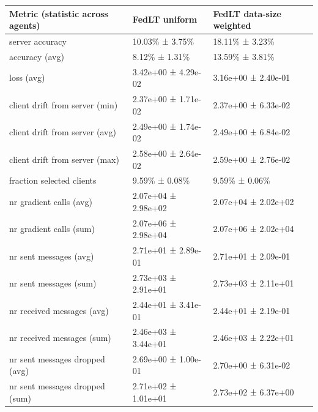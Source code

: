 \begin{tabular}{lll}
\hline
 Metric (statistic across agents)   & FedLT uniform       & FedLT data-size weighted   \\
\hline
 server accuracy                    & 10.03\% ± 3.75\%      & 18.11\% ± 3.23\%             \\
 accuracy (avg)                     & 8.12\% ± 1.31\%       & 13.59\% ± 3.81\%             \\
 loss (avg)                         & 3.42e+00 ± 4.29e-02 & 3.16e+00 ± 2.40e-01        \\
 client drift from server (min)     & 2.37e+00 ± 1.71e-02 & 2.37e+00 ± 6.33e-02        \\
 client drift from server (avg)     & 2.49e+00 ± 1.74e-02 & 2.49e+00 ± 6.84e-02        \\
 client drift from server (max)     & 2.58e+00 ± 2.64e-02 & 2.59e+00 ± 2.76e-02        \\
 fraction selected clients          & 9.59\% ± 0.08\%       & 9.59\% ± 0.06\%              \\
 nr gradient calls (avg)            & 2.07e+04 ± 2.98e+02 & 2.07e+04 ± 2.02e+02        \\
 nr gradient calls (sum)            & 2.07e+06 ± 2.98e+04 & 2.07e+06 ± 2.02e+04        \\
 nr sent messages (avg)             & 2.71e+01 ± 2.89e-01 & 2.71e+01 ± 2.09e-01        \\
 nr sent messages (sum)             & 2.73e+03 ± 2.91e+01 & 2.73e+03 ± 2.11e+01        \\
 nr received messages (avg)         & 2.44e+01 ± 3.41e-01 & 2.44e+01 ± 2.19e-01        \\
 nr received messages (sum)         & 2.46e+03 ± 3.44e+01 & 2.46e+03 ± 2.22e+01        \\
 nr sent messages dropped (avg)     & 2.69e+00 ± 1.00e-01 & 2.70e+00 ± 6.31e-02        \\
 nr sent messages dropped (sum)     & 2.71e+02 ± 1.01e+01 & 2.73e+02 ± 6.37e+00        \\
\hline
\end{tabular}